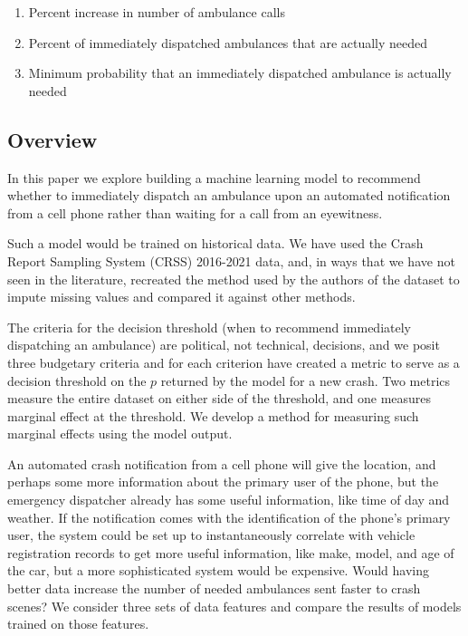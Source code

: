 \begin{enumerate}
	\item Percent increase in number of ambulance calls
	\item Percent of immediately dispatched ambulances that are actually needed
	\item Minimum probability that an immediately dispatched ambulance is actually needed
\end{enumerate}

\subsection{Overview}
\label{intro_overview}

In this paper we explore building a machine learning model to recommend whether to immediately dispatch an ambulance upon an automated notification from a cell phone rather than waiting for a call from an eyewitness.

Such a model would be trained on historical data.  We have used the Crash Report Sampling System (CRSS) 2016-2021 data, and, in ways that we have not seen in the literature, recreated the method used by the authors of the dataset to impute missing values and compared it against other methods.  

The criteria for the decision threshold (when to recommend immediately dispatching an ambulance) are political, not technical, decisions, and we posit three budgetary criteria and for each criterion have created a metric to serve as a decision threshold on the $p$ returned by the model for a new crash.  Two metrics measure the entire dataset on either side of the threshold, and one measures marginal effect at the threshold.  We develop a method for measuring such marginal effects using the model output. 

An automated crash notification from a cell phone will give the location, and perhaps some more information about the primary user of the phone, but the emergency dispatcher already has some useful information, like time of day and weather.  If the notification comes with the identification of the phone's primary user, the system could be set up to instantaneously correlate with vehicle registration records to get more useful information, like make, model, and age of the car, but a more sophisticated system would be expensive.  Would having better data increase the number of needed ambulances sent faster to crash scenes?  We consider three sets of data features and compare the results of models trained on those features.  

